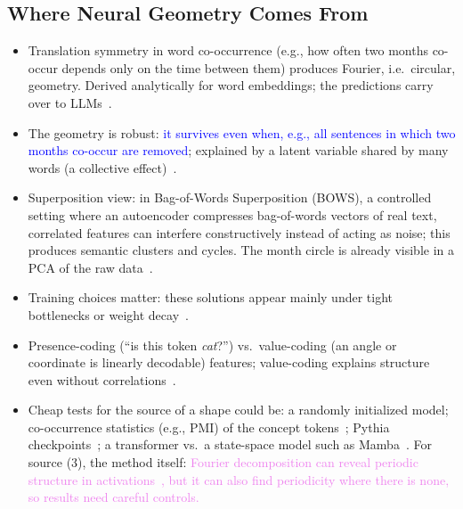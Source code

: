 \documentclass[11pt,a4paper]{article}
\newcommand{\fromextra}[1]{\textcolor{blue}{#1}}
\newcommand{\fromnotes}[1]{\textcolor{green!50!black}{#1}}
\newcommand{\fromold}[1]{\textcolor{violet}{#1}}
\newcommand{\fromclaude}[1]{\textcolor{orange!85!black}{#1}}
\newcommand{\fromextra}[1]{#1}
\newcommand{\fromnotes}[1]{#1}
\newcommand{\fromold}[1]{#1}
\newcommand{\fromclaude}[1]{#1}
\begin{document}
\subsection{Where Neural Geometry Comes From}\label{sec:origins}
\begin{itemize}
  \item Translation symmetry in word co-occurrence (e.g., how often two months co-occur depends only on the time between them) produces Fourier, i.e.\ circular, geometry. Derived analytically for word embeddings; the predictions carry over to LLMs~\cite{karkada2026symmetry}.
  \item The geometry is robust: \fromextra{it survives even when, e.g., all sentences in which two months co-occur are removed}; explained by a latent variable shared by many words (a collective effect)~\cite{karkada2026symmetry}.
  \item Superposition view: in \fromclaude{Bag-of-Words Superposition (BOWS), a controlled setting where an autoencoder compresses bag-of-words vectors of real text,} correlated features can interfere constructively instead of acting as noise; this produces semantic clusters and cycles. The month circle is already visible in a PCA of the raw data~\cite{prieto2026correlations}.
  \item Training choices matter: these solutions appear mainly under tight bottlenecks or weight decay~\cite{prieto2026correlations}.
  \item Presence-coding (\enquote{is this token \emph{cat}?}) vs.\ value-coding (an angle or coordinate is linearly decodable) features; value-coding explains structure even without correlations~\cite{prieto2026correlations}.
  \item \fromnotes{Cheap tests for the source of a shape could be: a randomly initialized model; co-occurrence statistics (e.g., PMI) of the concept tokens~\cite{karkada2026symmetry,prieto2026correlations}; Pythia checkpoints~\cite{biderman2023pythia}; a transformer vs.\ a state-space model such as Mamba~\cite{gu2023mamba}.} \fromclaude{For source (3), the method itself:} \fromold{Fourier decomposition can reveal periodic structure in activations~\cite{feucht2026arithmetic}, but it can also find periodicity where there is none, so results need careful controls.}
\end{itemize}

\end{document}
